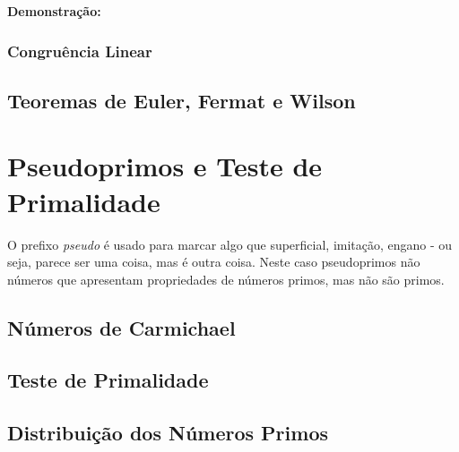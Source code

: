 \noindent \textbf{Demonstração:}

  		
	  		\subsubsection{Congruência Linear}
  		
  		\subsection{Teoremas de Euler, Fermat e Wilson}
	
	\section{Pseudoprimos e Teste de Primalidade}

O prefixo \textit{pseudo} é usado para marcar algo que superficial, imitação, engano - ou seja, parece ser uma coisa, mas é outra coisa. Neste caso pseudoprimos não números que apresentam propriedades de números primos, mas não são primos.
		
		\subsection{Números de Carmichael}
	
		\subsection{Teste de Primalidade}

	
	
		\subsection{Distribuição dos Números Primos}
		
		